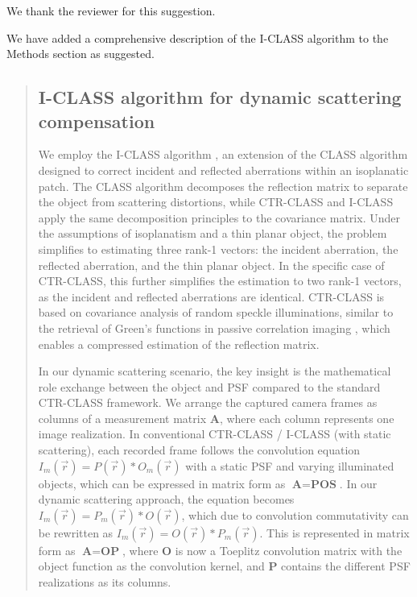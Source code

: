 \documentclass[12pt]{article}
\newenvironment{ourresponse}
    {\begin{tcolorbox}[width=\linewidth,breakable,enhanced,colback=gray!5,colframe=responsecolor!50,title=Response,left=5pt,right=5pt]}
    {\end{tcolorbox}}
\begin{document}
\begin{enumerate}[label=\arabic*.]

\begin{ourresponse}
We thank the reviewer for this suggestion.

We have added a comprehensive description of the I-CLASS algorithm to the Methods section as suggested.
\begin{quote}
    \subsection*{I-CLASS algorithm for dynamic scattering compensation}
        We employ the I-CLASS algorithm \cite{weinberg2024noninvasive}, an extension of the CLASS algorithm \cite{kang17, kang2024implementation} designed to correct incident and reflected aberrations within an isoplanatic patch. The CLASS algorithm decomposes the reflection matrix to separate the object from scattering distortions, while CTR-CLASS and I-CLASS apply the same decomposition principles to the covariance matrix. Under the assumptions of isoplanatism and a thin planar object, the problem simplifies to estimating three rank-1 vectors: the incident aberration, the reflected aberration, and the thin planar object. In the specific case of CTR-CLASS, this further simplifies the estimation to two rank-1 vectors, as the incident and reflected aberrations are identical. CTR-CLASS is based on covariance analysis of random speckle illuminations, similar to the retrieval of Green's functions in passive correlation imaging \cite{wapenaar2004retrieving}, which enables a compressed estimation of the reflection matrix.
        
        In our dynamic scattering scenario, the key insight is the mathematical role exchange between the object and PSF compared to the standard CTR-CLASS framework. We arrange the captured camera frames as columns of a measurement matrix $\textbf{A}$, where each column represents one image realization. In conventional CTR-CLASS / I-CLASS (with static scattering), each recorded frame follows the convolution equation $I_m(\vec{r}) = P(\vec{r}) \ast O_m(\vec{r})$ with a static PSF and varying illuminated objects, which can be expressed in matrix form as $\textbf{A} = \textbf{P}\textbf{O}\textbf{S}$. In our dynamic scattering approach, the equation becomes $I_m(\vec{r}) = P_m(\vec{r}) \ast O(\vec{r})$, which due to convolution commutativity can be rewritten as $I_m(\vec{r}) = O(\vec{r}) \ast P_m(\vec{r})$. This is represented in matrix form as $\textbf{A} = \textbf{O}\textbf{P}$, where $\textbf{O}$ is now a Toeplitz convolution matrix with the object function as the convolution kernel, and $\textbf{P}$ contains the different PSF realizations as its columns.


\end{quote}
\end{ourresponse}
\end{enumerate}
\end{document}
